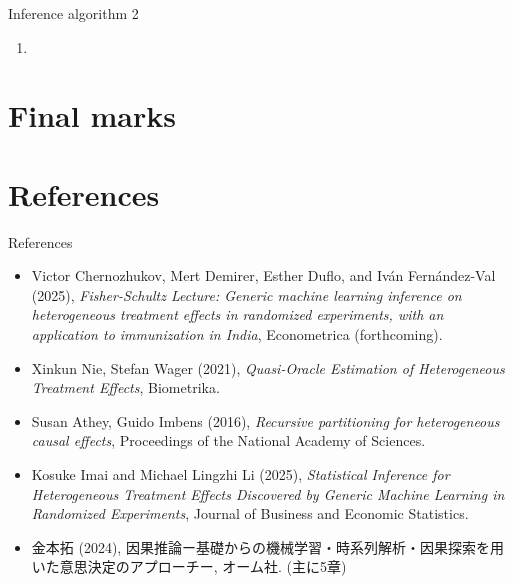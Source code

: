 \documentclass[xcolor=svgnames,aspectratio=169]{beamer}
\begin{document}
\begin{frame}{Inference algorithm 2}
    \begin{enumerate}
        \item 
    \end{enumerate}
\end{frame}

\section{Final marks}

\section{References}

\begin{frame}{References}
    \begin{itemize}
        \item Victor Chernozhukov, Mert Demirer, Esther Duflo, and Iván Fernández-Val (2025), \textit{Fisher-Schultz Lecture: Generic machine learning inference on heterogeneous treatment effects in randomized experiments, with an application to immunization in India}, Econometrica (forthcoming).
        \item Xinkun Nie, Stefan Wager (2021), \textit{Quasi-Oracle Estimation of Heterogeneous Treatment Effects}, Biometrika.
        \item Susan Athey, Guido Imbens (2016), \textit{Recursive partitioning for heterogeneous causal effects}, Proceedings of the National Academy of Sciences. 
        \item Kosuke Imai and Michael Lingzhi Li (2025), \textit{Statistical Inference for Heterogeneous Treatment Effects Discovered by Generic Machine Learning in Randomized Experiments}, Journal of Business and Economic Statistics. 
        \item 金本拓 (2024), 因果推論ー基礎からの機械学習・時系列解析・因果探索を用いた意思決定のアプローチー, オーム社. (主に5章)
    \end{itemize}
\end{frame}
\end{document}
